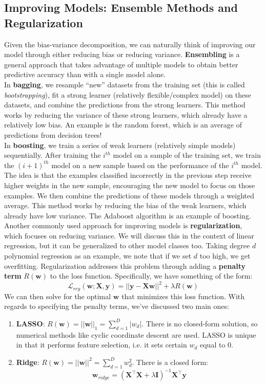 \documentclass[11pt, letterpaper]{article}
\theoremstyle{definition}
\theoremstyle{plain}
\begin{document}
\subsection{Improving Models: Ensemble Methods and Regularization}
Given the bias-variance decomposition, we can naturally think of improving our model through either reducing bias or reducing variance. \textbf{Ensembling} is a general approach that takes advantage of multiple models to obtain better predictive accuracy than with a single model alone. \\

In \textbf{bagging}, we resample ``new'' datasets from the training set (this is called \textit{bootstrapping}), fit a strong learner (relatively flexible/complex model) on these datasets, and combine the predictions from the strong learners. This method works by reducing the variance of these strong learners, which already have a relatively low bias. An example is the random forest, which is an average of predictions from decision trees! \\

In \textbf{boosting}, we train a series of weak learners (relatively simple models) sequentially. After training the $i^{th}$ model on a sample of the training set, we train the $(i+1)^{th}$ model on a new sample based on the performance of the $i^{th}$ model. The idea is that the examples classified incorrectly in the previous step receive higher weights in the new sample, encouraging the new model to focus on those examples. We then combine the predictions of these models through a weighted average. This method works by reducing the bias of the weak learners, which already have low variance. The Adaboost algorithm is an example of boosting. \\

Another commonly used approach for improving models is \textbf{regularization}, which focuses on reducing variance. We will discuss this in the context of linear regression, but it can be generalized to other model classes too. Taking degree $d$ polynomial regression as an example, we note that if we set $d$ too high, we get overfitting. Regularization addresses this problem through adding a \textbf{penalty term} $R(\bm w)$ to the loss function. Specifically, we have something of the form:
\[\mathcal{L}_{reg}(\bm w; \bm X, \bm y) = ||\bm y - \bm X \bm w||^2 + \lambda R(\bm w)\]
We can then solve for the optimal $\bm w$ that minimizes this loss function. With regards to specifying the penalty terms, we've discussed two main ones:
\begin{enumerate}
    \item \textbf{LASSO}: $R(\bm w) = ||\bm w||_1 = \sum_{d=1}^{D}|w_d|$. There is no closed-form solution, so numerical methods like cyclic coordinate descent are used. LASSO is unique in that it performs feature selection, i.e. it sets certain $w_d$ equal to 0.
    \item \textbf{Ridge}: $R(\bm w) = ||\bm w||^2 = \sum_{d=1}^{D}w_d^2$. There is a closed form:
    \[\bm w_{ridge} = (\bm{X}^\top\bm{X} + \lambda \bm I)^{-1}\bm{X}^\top\bm{y}\]
\end{enumerate}
\end{document}
